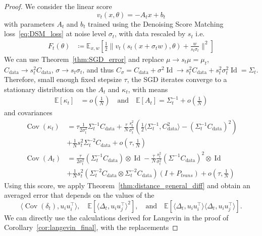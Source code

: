 \documentclass[11pt]{article}
\newcommand{\eqdef}{\coloneqq}
\newcommand{\id}{\operatorname{Id}}
\newcommand{\EE}{\mathbb{E}}
\newcommand{\cov}{\operatorname{Cov}}
\begin{document}
\begin{proof}
We consider the linear score
\begin{equation*}
    v_t(x, \theta) = -A_t x + b_t
\end{equation*}
with parameters \( A_t \) and \( b_t \) trained using the Denoising Score Matching loss~\eqref{eq:DSM_loss} at noise level \( \sigma_t \), with data rescaled by $s_t$ i.e.
\begin{align*}
   F_t(\theta) &\eqdef  \mathbb{E}_{x,w} \left[
    \frac{1}{2}  \| v_{t}\left(s_t(x+\sigma_t w), \theta\right) + \frac{w}{s_t\sigma_t} \|^2 \right]
\end{align*}
We can use Theorem~\ref{thm:SGD_error} and replace $\mu \to s_t \mu = \mu_t$, $C_{\mathrm{data}} \to s_t^2 C_{\mathrm{data}}$, $\sigma \to s_t \sigma_t$, and thus 
$C_\sigma = C_{\mathrm{data}} + \sigma^2 \id  \to s_t^2 C_{\mathrm{data}} +  s_t^2 \sigma_t^2 \id = \Sigma_t$.  Therefore, small enough fixed stepsize $\tau$, the SGD iterates converge to a stationary distribution on the $A_t$ and $\kappa_t$, with means 
\begin{align*}
 \EE[\kappa_t] &= o\left( \frac{1}{N}\right) \quad \text{and} \quad
 \EE[A_t] =  \Sigma_t^{-1} + o\left( \frac{1}{N}\right)
\end{align*}
and covariances
\begin{align*}
\cov(\kappa_t) &=  \tau \frac{1}{2 \sigma_t^2}\Sigma_t^{-1} C_\mathrm{data} + \frac{\tau}{N}\frac{s_t^2}{\sigma_t^2} \left(\frac{1}{2} \langle \Sigma_t^{-1},C_\mathrm{data}^2 \rangle - (\Sigma_t^{-1} C_\mathrm{data})^2\right) \\ &+ \nonumber \frac{1}{N}s_t^2 \Sigma_t^{-2} C_\mathrm{data} + o \left(\tau, \frac{1}{N}\right) \\
\cov(A_t) &=  \frac{\tau}{2\sigma_t^2} \left(\Sigma_t^{-1} C_\mathrm{data} \right)\otimes \id - \frac{\tau}{N} \frac{s_t^2}{\sigma_t^2} (\Sigma^{-1} C_\mathrm{data})^2 \otimes \id \\
&+ \nonumber \frac{1}{N} s_t^2 (\Sigma_t^{-2} C_\mathrm{data} \otimes \Sigma_t^{-2}C_\mathrm{data}) (I + P_{trans}) + o\left(\tau, \frac{1}{N}\right)
\end{align*}
Using this score, we apply Theorem~\ref{thm:distance_general_diff} and obtain an averaged error that depends on the values of the
\[
\langle \cov(\delta_{t}), u_i u_i^\top \rangle, \quad \mathbb{E}[\langle \Delta_{t}, u_i u_j^\top \rangle^2], \quad \text{and} \quad \mathbb{E}[\langle \Delta_{t}, u_i u_i^\top \rangle \langle \Delta_{t}, u_i u_j^\top \rangle].
\]
We can directly use the calculations derived for Langevin in the proof of Corollary~\ref{cor:langevin_final}, with the replacements

\end{proof}
\end{document}
